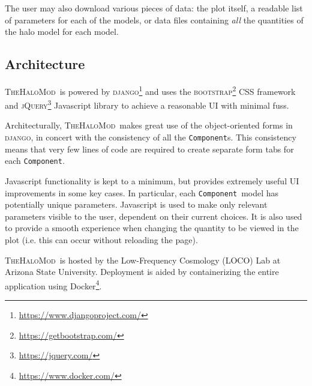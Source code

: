 \documentclass[5p,aas_macros]{elsarticle}
\newcommand{\thm}{\textsc{TheHaloMod}}
\newcommand{\component}{\texttt{Component}}
\begin{document}
The user may also download various pieces of data: the plot itself, a readable list of parameters for each of the models, or data files containing \textit{all} the quantities of the halo model for each model.


\subsection{Architecture}
\thm\ is powered by \textsc{django}\footnote{\url{https://www.djangoproject.com/}} and uses the \textsc{bootstrap}\footnote{\url{https://getbootstrap.com/}} CSS framework and \textsc{jQuery}\footnote{\url{https://jquery.com/}} Javascript library to achieve a reasonable UI with minimal fuss.

Architecturally, \thm\ makes great use of the object-oriented forms in \textsc{django}, in concert with the consistency of all the \texttt{Component}s. 
This consistency means that very few lines of code are required to create separate form tabs for each \component. 

Javascript functionality is kept to a minimum, but provides extremely useful UI improvements in some key cases. 
In particular, each \component\ model has potentially unique parameters. Javascript is used to make only relevant parameters visible to the user, dependent on their current choices. 
It is also used to provide a smooth experience when changing the quantity to be viewed in the plot (i.e. this can occur without reloading the page).

\thm\ is hosted by the Low-Frequency Cosmology (LOCO) Lab at Arizona State University. Deployment is aided by containerizing the entire application using Docker\footnote{\url{https://www.docker.com/}}.



%
\end{document}
